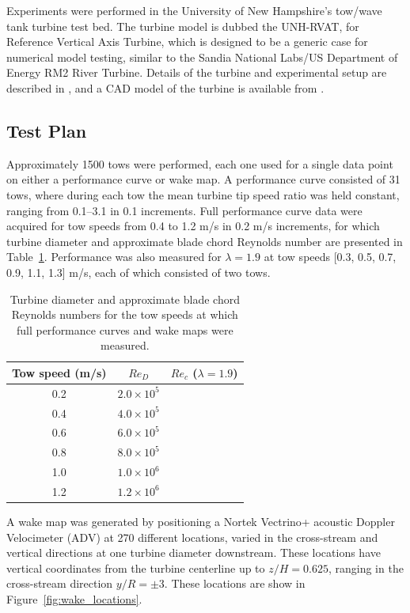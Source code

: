 \documentclass[energies,article,accept,moreauthors,pdftex,12pt,a4paper]{mdpi}
\begin{document}
Experiments were performed in the University of New Hampshire's tow/wave tank
turbine test bed. The turbine model is dubbed the UNH-RVAT, for Reference
Vertical Axis Turbine, which is designed to be a generic case for numerical
model testing, similar to the Sandia National Labs/US Department of Energy RM2
River Turbine. Details of the turbine and experimental setup are described in
\cite{Bachant2014_JOT}, and a CAD model of the turbine is available from
\cite{Bachant2014_CAD}.



\subsection{Test Plan} 

Approximately 1500 tows were performed, each one used for a single data point on
either a performance curve or wake map. A performance curve consisted of 31
tows, where during each tow the mean turbine tip speed ratio was held constant,
ranging from 0.1--3.1 in 0.1 increments. Full performance curve data were
acquired for tow speeds from 0.4 to 1.2 m/s in 0.2 m/s increments, for which
turbine diameter and approximate blade chord Reynolds number are presented in
Table~\ref{tab:Re}. Performance was also measured for $\lambda=1.9$ at tow
speeds [0.3, 0.5, 0.7, 0.9, 1.1, 1.3] m/s, each of which consisted of two tows.

\begin{table}
\centering
\begin{tabular}{ccc}
Tow speed (m/s) & $Re_D$ & $Re_c$ ($\lambda = 1.9$) \\ 
\hline
0.2 & $2.0 \times 10^5$ &  \\ 
0.4 & $4.0 \times 10^5$ &  \\ 
0.6 & $6.0 \times 10^5$ &  \\ 
0.8 & $8.0 \times 10^5$ &  \\ 
1.0 & $1.0 \times 10^6$ &  \\ 
1.2 & $1.2 \times 10^6$ &  \\ 
\end{tabular} 
\caption{Turbine diameter and approximate blade chord Reynolds numbers for the
tow speeds at which full performance curves and wake maps were measured.}
\label{tab:Re}
\end{table}

A wake map was generated by positioning a Nortek Vectrino+ acoustic Doppler
Velocimeter (ADV) at 270 different locations, varied in the cross-stream and
vertical directions at one turbine diameter downstream. These locations have
vertical coordinates from the turbine centerline up to $z/H=0.625$, ranging in
the cross-stream direction $y/R = \pm 3$. These locations are show in
Figure~\ref{fig:wake_locations}.
\end{document}
